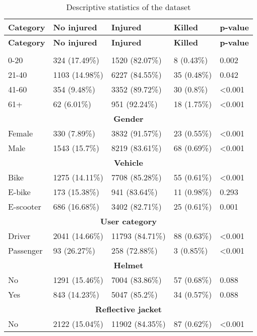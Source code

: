 \begin{longtable}{p{4.5cm}p{3cm}p{3cm}p{3cm}p{1.5cm}}
\caption{Descriptive statistics of the dataset} \label{tab:data} \\
\hline
\textbf{Category} & \textbf{No injured} & \textbf{Injured} & \textbf{Killed} & \textbf{p-value} \\
\hline
\endfirsthead

\hline
\textbf{Category} & \textbf{No injured} & \textbf{Injured} & \textbf{Killed} & \textbf{p-value}  \\
\hline
\endhead

\hline
\endfoot

\hline
\endlastfoot
\multicolumn{5}{c}{\textbf{Age category}} \\
0-20 & 324 (17.49\%) & 1520 (82.07\%) & 8 (0.43\%) & 0.002  \\
21-40 & 1103 (14.98\%) & 6227 (84.55\%) & 35 (0.48\%) & 0.042  \\
41-60 & 354 (9.48\%) & 3352 (89.72\%) & 30 (0.8\%) & <0.001  \\
61+ & 62 (6.01\%) & 951 (92.24\%) & 18 (1.75\%) & <0.001  \\
\hline
\multicolumn{5}{c}{\textbf{Gender}} \\
Female & 330 (7.89\%) & 3832 (91.57\%) & 23 (0.55\%) & <0.001  \\
Male & 1543 (15.7\%) & 8219 (83.61\%) & 68 (0.69\%) & <0.001  \\
\hline
\multicolumn{5}{c}{\textbf{Vehicle}} \\
Bike & 1275 (14.11\%) & 7708 (85.28\%) & 55 (0.61\%) & <0.001  \\
E-bike & 173 (15.38\%) & 941 (83.64\%) & 11 (0.98\%) & 0.293  \\
E-scooter & 686 (16.68\%) & 3402 (82.71\%) & 25 (0.61\%) & 0.001  \\
\hline
\multicolumn{5}{c}{\textbf{User category}} \\
Driver & 2041 (14.66\%) & 11793 (84.71\%) & 88 (0.63\%) & <0.001  \\
Passenger & 93 (26.27\%) & 258 (72.88\%) & 3 (0.85\%) & <0.001  \\
\hline
\multicolumn{5}{c}{\textbf{Helmet}} \\
No & 1291 (15.46\%) & 7004 (83.86\%) & 57 (0.68\%) & 0.088  \\
Yes & 843 (14.23\%) & 5047 (85.2\%) & 34 (0.57\%) & 0.088  \\
\hline
\multicolumn{5}{c}{\textbf{Reflective jacket}} \\
No & 2122 (15.04\%) & 11902 (84.35\%) & 87 (0.62\%) & <0.001  \\

\end{longtable}
